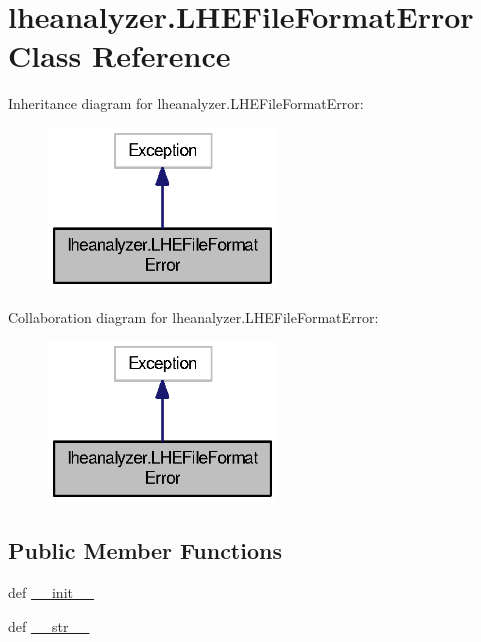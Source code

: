\section{lheanalyzer.\-L\-H\-E\-File\-Format\-Error Class Reference}
\label{classlheanalyzer_1_1LHEFileFormatError}


Inheritance diagram for lheanalyzer.\-L\-H\-E\-File\-Format\-Error\-:
\nopagebreak
\begin{figure}[H]
\begin{center}
\leavevmode
\includegraphics[width=172pt]{classlheanalyzer_1_1LHEFileFormatError__inherit__graph}
\end{center}
\end{figure}


Collaboration diagram for lheanalyzer.\-L\-H\-E\-File\-Format\-Error\-:
\nopagebreak
\begin{figure}[H]
\begin{center}
\leavevmode
\includegraphics[width=172pt]{classlheanalyzer_1_1LHEFileFormatError__coll__graph}
\end{center}
\end{figure}
\subsection*{Public Member Functions}
\begin{DoxyCompactItemize}
\item 
def \hyperlink{classlheanalyzer_1_1LHEFileFormatError_acf3ac1e0a9ce0d3b61da8a30625b32c2}{\-\_\-\-\_\-init\-\_\-\-\_\-}
\item 
def \hyperlink{classlheanalyzer_1_1LHEFileFormatError_ab49cc8b0df86f2be9efe1a6cc3b824ef}{\-\_\-\-\_\-str\-\_\-\-\_\-}
\end{DoxyCompactItemize}
